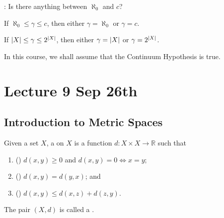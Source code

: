 \documentclass[notoc,notitlepage]{tufte-book}
\begin{document}
: Is there anything between $\aleph_0$ and $c$?

\begin{axiom}
\label{axiom:continuum_hypothesis}
  If $\aleph_0 \leq \gamma \leq c$, then either $\gamma = \aleph_0$ or $\gamma = c$.
\end{axiom}

\begin{axiom}
\label{axiom:generalized_continuum_hypothesis}
  If $\left|X\right| \leq \gamma \leq 2^{\left|X\right|}$, then either $\gamma = \left|X\right|$ or $\gamma = 2^{\left|X\right|}$.
\end{axiom}

In this course, we shall assume that the Continuum Hypothesis is true.




\chapter{Lecture 9 Sep 26th}%
\label{chp:lecture_9_sep_26th}

\section{Introduction to Metric Spaces}%
\label{sec:introduction_to_metric_spaces}

\begin{defn}
\label{defn:metric_n_metric_space}
  Given a set $X$, a  on $X$ is a function $d : X \times X \to \mathbb{R}$ such that
  \begin{enumerate}
    \item () $d(x, y) \geq 0$ and $d(x, y) = 0 \iff x = y$;
    \item () $d(x, y) = d(y, x)$; and
    \item () $d(x, y) \leq d(x, z) + d(z, y)$.
  \end{enumerate}
  The pair $(X, d)$ is called a .
\end{defn}
\end{document}
